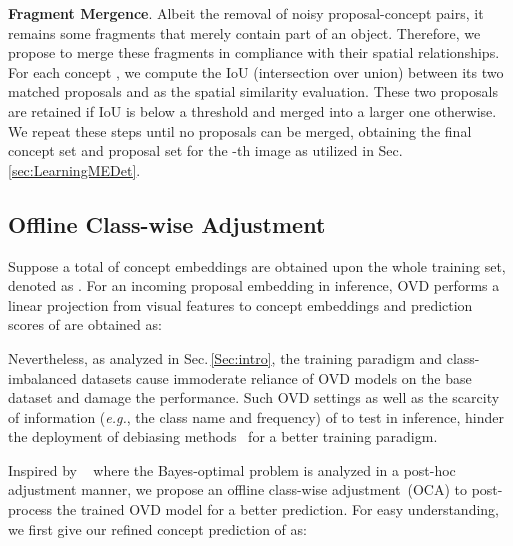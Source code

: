 \documentclass[10pt,twocolumn,letterpaper]{article}
\begin{document}
\textbf{Fragment Mergence}.
Albeit the removal of noisy proposal-concept pairs, it remains some fragments that merely contain part of an object. Therefore, we propose to merge these fragments in compliance with their spatial relationships. For each concept , we compute the IoU (intersection over union) between its two matched proposals  and  as the spatial similarity evaluation.
These two proposals are retained if IoU is below a threshold  and merged into a larger one otherwise. We repeat these steps until no proposals can be merged, 
obtaining the final concept set  and proposal set  for the -th image  as utilized in Sec.\,\ref{sec:LearningMEDet}.












\subsection{Offline Class-wise Adjustment}
\label{sec:CBA}












Suppose a total of  concept embeddings are obtained upon the whole training set, denoted as . For an incoming proposal embedding  in inference, OVD performs a linear projection from visual features to concept embeddings and prediction scores of  are obtained as:


Nevertheless, as analyzed in Sec.\,\ref{Sec:intro}, the training paradigm and class-imbalanced datasets cause immoderate reliance of OVD models on the base dataset and damage the performance. 
Such OVD settings as well as the scarcity of information (\emph{e.g.}, the class name and frequency) of  to test in inference, hinder the deployment of debiasing methods~\cite{tan2020equalizationloss,chang2021resampling,li2020balancedgroupsoftmax} for a better training paradigm.














Inspired by ~\cite{menon2020logitadjustment} where the Bayes-optimal problem is analyzed in a post-hoc adjustment manner, we propose an offline class-wise adjustment~(OCA) to post-process the trained OVD model for a better prediction. For easy understanding, we first give our refined concept prediction of  as:
\end{document}

